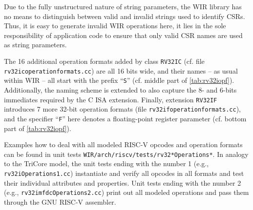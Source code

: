 \begin{wirWarn}
Due to the fully unstructured nature of string parameters, the \gls{WIR} library has no means to distinguish between valid and invalid strings used to identify \glspl{CSR}.
Thus, it is easy to generate invalid \gls{WIR} operations here, it lies in the sole responsibility of application code to ensure that only valid \gls{CSR} names are used as string parameters.
\end{wirWarn}

The 16 additional operation formats added by class \texttt{RV32IC} (cf. file \texttt{rv32icoperationformats.cc}) are all 16 bits wide, and their names -- as usual within \gls{WIR} -- all start with the prefix ``\texttt{S}'' (cf. middle part of \cref{tab:rv32iopf}).
Additionally, the naming scheme is extended to also capture the 8- and 6-bits immediates required by the C \gls{ISA} extension.
Finally, extension \texttt{RV32IF} introduces 7 more 32-bit operation formats (file \texttt{rv32ifoperationformats.cc}), and the specifier ``\texttt{F}'' here denotes a floating-point register parameter (cf. bottom part of \cref{tab:rv32iopf}).

Examples how to deal with all modeled RISC-V opcodes and operation formats can be found in unit tests \texttt{WIR/arch/riscv/tests/rv32*Operations*}.
In analogy to the TriCore model, the unit tests ending with the number 1 (e.g., \texttt{rv32iOperations1.cc}) instantiate and verify all opcodes in all formats and test their individual attributes and properties.
Unit tests ending with the number 2 (e.g., \texttt{rv32imfdcOperations2.cc}) print out all modeled operations and pass them through the GNU RISC-V assembler.

